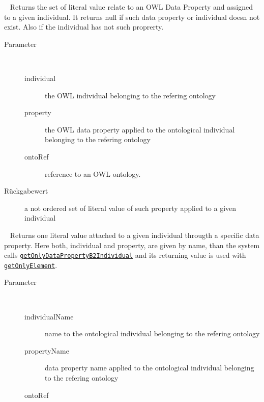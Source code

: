 \begin{description}
~ Returns the set of literal value relate to an OWL Data Property 
 and assigned to a given individual. It returns null if such data property or
 individual doesn not exist. Also if the individual has not such
 proprerty.
\begin{description}
\item[Parameter] ~
\begin{description}
\item[individual]
the OWL individual belonging to the refering ontology
\item[property]
the OWL data property applied to the ontological individual belonging to the refering ontology
\item[ontoRef]
reference to an OWL ontology.
\end{description}
\item[Rückgabewert] 
a not ordered set of literal value of such property applied to a given individual
\end{description}
\item[{\ltdHypertarget{ontologyFramework.OFContextManagement.OWLLibrary.getOnlyDataPropertyB2Individual(java.lang.String,java.lang.String,ontologyFramework.OFContextManagement.OWLReferences)}{getOnlyDataPropertyB2Individual}\label{ontologyFramework.OFContextManagement.OWLLibrary.getOnlyDataPropertyB2Individual(java.lang.String,java.lang.String,ontologyFramework.OFContextManagement.OWLReferences)}}]
~ Returns one literal value attached to a given individual
 througth a specific data property. Here both, individual and property, are given
 by name, than the system calls \texttt{\hyperlink{ontologyFramework.OFContextManagement.OWLLibrary.getOnlyDataPropertyB2Individual(java.lang.String,java.lang.String,ontologyFramework.OFContextManagement.OWLReferences)}{getOnlyDataPropertyB2Individual}}
 and its returning value is used with \texttt{\hyperlink{ontologyFramework.OFContextManagement.OWLLibrary.getOnlyElement(java.util.Set<?>)}{getOnlyElement}}.
\begin{description}
\item[Parameter] ~
\begin{description}
\item[individualName]
name to the ontological individual belonging to the refering ontology
\item[propertyName]
data property name applied to the ontological individual belonging to the refering ontology
\item[ontoRef]

\end{description}
\end{description}
\end{description}
